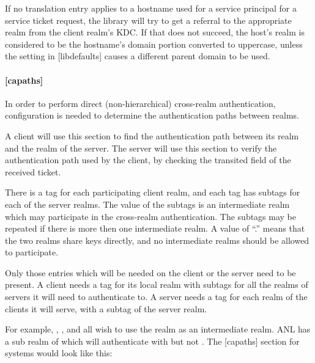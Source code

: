 \documentclass[letterpaper,10pt,english]{sphinxmanual}
\begin{document}
If no translation entry applies to a hostname used for a service
principal for a service ticket request, the library will try to get a
referral to the appropriate realm from the client realm’s KDC.  If
that does not succeed, the host’s realm is considered to be the
hostname’s domain portion converted to uppercase, unless the
 setting in {[}libdefaults{]} causes a different
parent domain to be used.


\paragraph{{[}capaths{]}}
\label{\detokenize{admin/conf_files/krb5_conf:id4}}\label{\detokenize{admin/conf_files/krb5_conf:capaths}}
In order to perform direct (non-hierarchical) cross-realm
authentication, configuration is needed to determine the
authentication paths between realms.

A client will use this section to find the authentication path between
its realm and the realm of the server.  The server will use this
section to verify the authentication path used by the client, by
checking the transited field of the received ticket.

There is a tag for each participating client realm, and each tag has
subtags for each of the server realms.  The value of the subtags is an
intermediate realm which may participate in the cross-realm
authentication.  The subtags may be repeated if there is more then one
intermediate realm.  A value of “.” means that the two realms share
keys directly, and no intermediate realms should be allowed to
participate.

Only those entries which will be needed on the client or the server
need to be present.  A client needs a tag for its local realm with
subtags for all the realms of servers it will need to authenticate to.
A server needs a tag for each realm of the clients it will serve, with
a subtag of the server realm.

For example, , , and  all wish to
use the  realm as an intermediate realm.  ANL has a sub
realm of  which will authenticate with 
but not .  The {[}capaths{]} section for  systems
would look like this:
\end{document}
